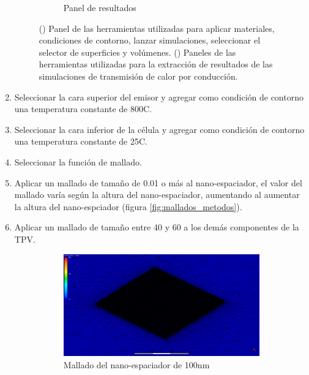 \begin{enumerate}
\begin{figure}[H]
\begin{subfigure}[b]{0.48\textwidth}
			\caption{Panel de resultados}
			\label{fig:paneles_resultados}
		\end{subfigure}
		\caption{() Panel de las herramientas utilizadas para aplicar materiales, condiciones de contorno, lanzar simulaciones, seleccionar el selector de superficies y volúmenes. () Paneles de las herramientas utilizadas para la extracción de resultados de las simulaciones de transmisión de calor por conducción.}
		\label{fig:paneles_CFD}
	\end{figure}
	\item Seleccionar la cara superior del emisor y agregar como condición de contorno una temperatura constante de 800\textdegree C.
	\item Seleccionar la cara inferior de la célula y agregar como condición de contorno una temperatura constante de 25\textdegree C.
	\item Seleccionar la función de mallado.
	\item Aplicar un mallado de tamaño de 0.01 o más al nano-espaciador, el valor del mallado varía según la altura del nano-espaciador, aumentando al aumentar la altura del nano-espciador (figura \ref{fig:mallados_metodos}).
	\item Aplicar un mallado de tamaño entre 40 y 60 a los demás componentes de la TPV.
	\begin{figure}[H]
	\centering
	\begin{subfigure}[b]{0.3\textwidth}
		\centering
			\includegraphics[width=1.00\textwidth]{figuras/Procedimiento_Simulaciones/Conduccion/mallado_100.png}
		\caption{Mallado del nano-espaciador de 100nm}
		\label{fig:mallado_100_metodos}
	\end{subfigure}
	\hfill
	\begin{subfigure}[b]{0.3\textwidth}
		\centering

\end{subfigure}
\end{figure}
\end{enumerate}
